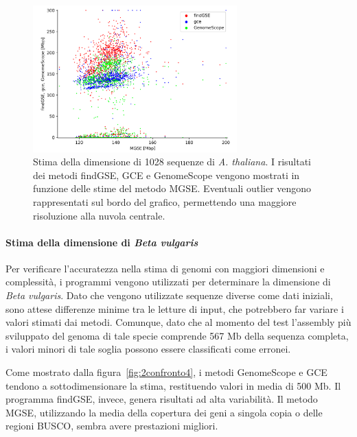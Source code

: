 \documentclass[crop=false, class=book]{standalone}
\begin{document}
	\begin{figure}[]
		\centering
		\includegraphics[width=0.7\textwidth]{capitoli/analisi/confronto/confronto2/2.png}
		\caption{Stima della dimensione di 1028 sequenze di \textit{A. thaliana}. I risultati dei metodi findGSE, GCE e GenomeScope vengono mostrati in funzione delle stime del metodo MGSE. Eventuali outlier vengono rappresentati sul bordo del grafico, permettendo una maggiore risoluzione alla nuvola centrale.}
		\label{fig:2confronto3}
	\end{figure} 

	\paragraph{Stima della dimensione di \textit{Beta vulgaris}}
	Per verificare l'accuratezza nella stima di genomi con maggiori dimensioni e complessità, i programmi vengono utilizzati per determinare la dimensione di \textit{Beta vulgaris}. Dato che vengono utilizzate sequenze diverse come dati iniziali, sono attese differenze minime tra le letture di input, che potrebbero far variare i valori stimati dai metodi. Comunque, dato che al momento del test l'assembly più sviluppato del genoma di tale specie comprende 567 Mb della sequenza completa, i valori minori di tale soglia possono essere classificati come erronei. 
	
	Come mostrato dalla figura~\vref{fig:2confronto4}, i metodi GenomeScope e GCE tendono a sottodimensionare la stima, restituendo valori in media di 500 Mb. Il programma findGSE, invece, genera risultati ad alta variabilità. Il metodo MGSE, utilizzando la media della copertura dei geni a singola copia o delle regioni BUSCO, sembra avere prestazioni migliori.
	
\end{document}
